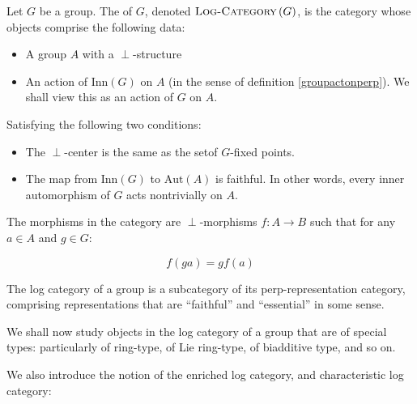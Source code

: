 \documentclass[a4paper]{amsart}
\newcommand{\logcategory}[1]{\textsc{Log-Category}\left(#1\right)}
\newcommand{\aut}[1]{\text{Aut}\left(#1\right)}
\newcommand{\inn}[1]{\text{Inn}\left(#1\right)}
\begin{document}
\begin{definer}
  Let $G$ be a group. The  of $G$, denoted
  $\logcategory{G}$, is the category whose objects comprise the
  following data:

  \begin{itemize}

  \item A group $A$ with a $\perp$-structure

  \item An action of $\inn{G}$ on $A$ (in the sense of definition \ref{groupactonperp}). We shall view this as an action of $G$ on $A$.

  \end{itemize}

  Satisfying the following two conditions:

  \begin{itemize}

  \item The $\perp$-center is the same as the setof $G$-fixed points.

  \item The map from $\inn{G}$ to $\aut{A}$ is faithful. In other
    words, every inner automorphism of $G$ acts nontrivially on $A$.

  \end{itemize}

  The morphisms in the category are $\perp$-morphisms $f: A \to B$
  such that for any $a \in A$ and $g \in G$:

  $$f(ga) = gf(a)$$

\end{definer}

The log category of a group is a subcategory of its
perp-representation category, comprising representations that are
``faithful'' and ``essential'' in some sense. 

We shall now study objects in the log category of a group that are of
special types: particularly of ring-type, of Lie ring-type, of
biadditive type, and so on.

We also introduce the notion of the enriched log category, and
characteristic log category:
\end{document}
